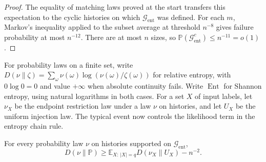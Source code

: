 \begin{proof}
The equality of matching laws proved at the start transfers this
expectation to the cyclic histories on which $\mathcal G_{\mathrm{ent}}$ was defined.
For each $m$, Markov's inequality applied to the subset average at
threshold $n^{-8}$ gives failure probability at most $n^{-12}$.
There are at most $n$ sizes, so
$\mathbb P(\mathcal G_{\mathrm{ent}}^c)\le n^{-11}=o(1)$.
\end{proof}

For probability laws on a finite set, write
$D(\nu\|\zeta)=\sum_\omega\nu(\omega)\log(\nu(\omega)/\zeta(\omega))$
for relative entropy, with $0\log0=0$ and value $+\infty$ when absolute
continuity fails. Write $\operatorname{Ent}$ for Shannon entropy, using
natural logarithms in both cases.
For a set $X$ of input labels, let $\nu_X$ be the endpoint restriction
law under a law $\nu$ on histories, and let $U_X$ be the uniform injection
law. The typical event now controls the likelihood term in the entropy
chain rule.

\begin{lemma}
\label{frames:shadow-entropy}
For every probability law $\nu$ on histories supported on $\mathcal G_{\mathrm{ent}}$,
\begin{equation}\label{frames:entropy-comparison}
 D(\nu\|\mathbb P)\ge
       \mathbb E_{X:\,|X|=q}D(\nu_X\|U_X)-n^{-2}.
\end{equation}
\end{lemma}

